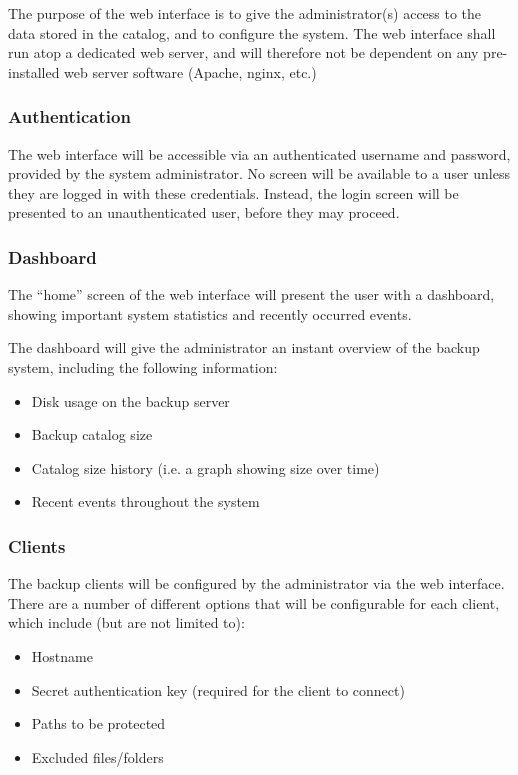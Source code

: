 The purpose of the web interface is to give the administrator(s) access to the
data stored in the catalog, and to configure the system. The web interface
shall run atop a dedicated web server, and will therefore not be dependent on
any pre-installed web server software (Apache, nginx, etc.)

\subsubsection{Authentication}

The web interface will be accessible via an authenticated username and
password, provided by the system administrator. No screen will be available to
a user unless they are logged in with these credentials. Instead, the login
screen will be presented to an unauthenticated user, before they may proceed.

\subsubsection{Dashboard}

The ``home'' screen of the web interface will present the user with
a dashboard, showing important system statistics and recently occurred events.

The dashboard will give the administrator an instant overview of the backup
system, including the following information:

\begin{itemize}
    \item Disk usage on the backup server
    \item Backup catalog size
    \item Catalog size history (i.e. a graph showing size over time)
    \item Recent events throughout the system
\end{itemize}

\subsubsection{Clients}

The backup clients will be configured by the administrator via the web
interface. There are a number of different options that will be configurable
for each client, which include (but are not limited to):

\begin{itemize}
    \item Hostname
    \item Secret authentication key (required for the client to connect)
    \item Paths to be protected
    \item Excluded files/folders
\end{itemize}

